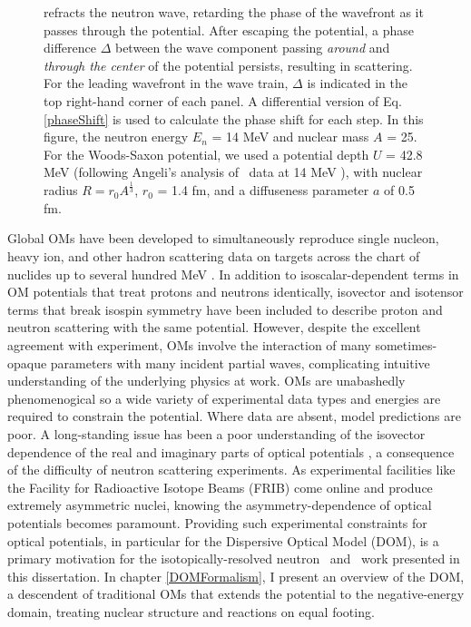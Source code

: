 \begin{figure}
{        refracts the neutron wave,
        retarding the phase of the wavefront as it passes through the
        potential. After escaping the potential, a phase difference $\Delta$ between
        the wave component passing \textit{around} and \textit{through the center}
        of the potential persists, resulting in scattering.
        For the leading wavefront in the wave train, $\Delta$ is indicated in
        the top right-hand corner of each panel. A differential version of
        Eq. \ref{phaseShift} is used to
        calculate the phase shift for each step. In this figure, the neutron
        energy $E_{n}$ = 14 MeV and nuclear mass $A$ = 25. For the Woods-Saxon potential,
        we used a potential depth $U$ = 42.8 MeV (following Angeli's analysis
        of \tot\ data at 14 MeV \cite{Angeli1970}), with nuclear radius $R = 
        r_{0}A^{\frac{1}{3}}$, $r_{0}$ = 1.4 fm, and a diffuseness parameter
        $a$ of 0.5 fm.
    }
    \label{RamsauerPhaseShiftFigure}
\end{figure}

Global OMs have been developed to simultaneously reproduce single nucleon, heavy ion,
and other hadron scattering data on targets across the chart of nuclides up to several
hundred MeV \cite{CH89, KoningDelaroche}. In addition to isoscalar-dependent terms
in OM potentials that treat protons
and neutrons identically, isovector and isotensor terms that break isospin
symmetry have been included to describe proton and neutron scattering with the
same potential. However, despite the excellent agreement with experiment, OMs 
involve the interaction of many sometimes-opaque parameters with many incident
partial waves, complicating intuitive understanding of the underlying physics at work.
OMs are unabashedly phenomenogical so a wide variety of
experimental data types and energies are required to constrain the potential.
Where data are absent, model predictions are poor. A long-standing issue has
been a poor understanding of the isovector dependence of the real and
imaginary parts of optical potentials \cite{Holt16}, a consequence of the
difficulty of neutron scattering experiments. As experimental facilities like
the Facility for Radioactive Isotope Beams (FRIB) come online and produce
extremely asymmetric nuclei, knowing the asymmetry-dependence of optical
potentials becomes paramount. Providing such experimental constraints for optical
potentials, in particular for the Dispersive Optical Model (DOM), is a primary 
motivation for the isotopically-resolved neutron \tot\ and \el\ work presented in this 
dissertation. In chapter \ref{DOMFormalism}, I present an overview of the DOM, a descendent of 
traditional OMs that extends the potential to the negative-energy domain, treating
nuclear structure and reactions on equal footing. 

